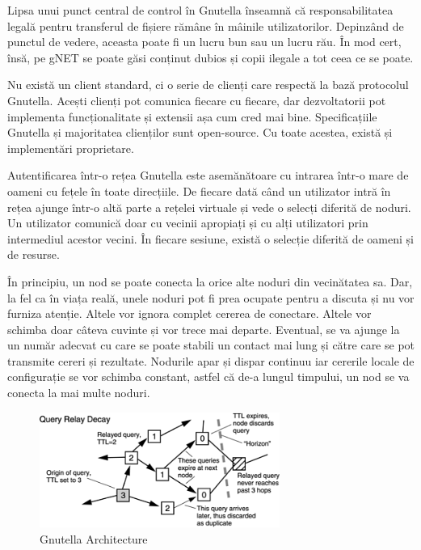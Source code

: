 Lipsa unui punct central de control în Gnutella înseamnă că responsabilitatea
legală pentru transferul de fișiere rămâne în mâinile utilizatorilor.
Depinzând de punctul de vedere, aceasta poate fi un lucru bun sau un lucru
rău. În mod cert, însă, pe gNET se poate găsi conținut dubios și copii ilegale
a tot ceea ce se poate.

Nu există un client standard, ci o serie de clienți care respectă la bază
protocolul Gnutella. Acești clienți pot comunica fiecare cu fiecare, dar
dezvoltatorii pot implementa funcționalitate și extensii așa cum cred mai
bine. Specificațiile Gnutella și majoritatea clienților sunt open-source. Cu
toate acestea, există și implementări proprietare.

Autentificarea într-o rețea Gnutella este asemănătoare cu intrarea într-o mare
de oameni cu fețele în toate direcțiile. De fiecare dată când un utilizator
intră în rețea ajunge într-o altă parte a rețelei virtuale și vede o selecți
diferită de noduri. Un utilizator comunică doar cu vecinii apropiați și cu
alți utilizatori prin intermediul acestor vecini. În fiecare sesiune, există o
selecție diferită de oameni și de resurse.

În principiu, un nod se poate conecta la orice alte noduri din vecinătatea sa.
Dar, la fel ca în viața reală, unele noduri pot fi prea ocupate pentru a
discuta și nu vor furniza atenție. Altele vor ignora complet cererea de
conectare. Altele vor schimba doar câteva cuvinte și vor trece mai departe.
Eventual, se va ajunge la un număr adecvat cu care se poate stabili un contact
mai lung și către care se pot transmite cereri și rezultate. Nodurile apar și
dispar continuu iar cererile locale de configurație se vor schimba constant,
astfel că de-a lungul timpului, un nod se va conecta la mai multe noduri.

\begin{figure}
  \centering
  \includegraphics[width=0.7\textwidth]{src/img/p2p-systems/gnutella}
  \caption{Gnutella Architecture}
  \label{fig:p2p-systems:gnutella}
\end{figure}

